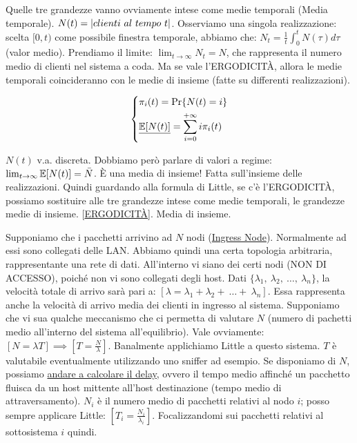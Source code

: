 Quelle tre grandezze vanno ovviamente intese come medie temporali (Media temporale). $N(t) = \left\vert{clienti\ al\ tempo\ t}\right\vert$. Osserviamo una singola realizzazione: scelta $[0,t)$ come possibile finestra temporale, abbiamo che: $N_t = \frac{1}{t}\int_0^t{N(\tau)d\tau}$ (valor medio). Prendiamo il limite: $\lim_{t\to\infty}{N_t} = N$, che rappresenta il numero medio di clienti nel sistema a coda. Ma se vale l'ERGODICIT\`A, allora le medie temporali coincideranno con le medie di insieme (fatte su differenti realizzazioni).

\[
	\left\{
	\begin{aligned}	
	&\pi_i(t) = \Pr\{N(t) = i\}\\
	&\underline{\operatorname{\mathbb{E}}[N(t)]} = \sum_{i=0}^{+\infty}{i\pi_i(t)}
	\end{aligned}
	\right.
\]

$N(t)$ v.a. discreta. Dobbiamo però parlare di valori a regime: $\lim_{t\to\infty}{\operatorname{\mathbb{E}}[N(t)]} = \bar{N}$. \`E una media di insieme! Fatta sull'insieme delle realizzazioni. Quindi guardando alla formula di Little, se c'è l'ERGODICIT\`A, possiamo sostituire alle tre grandezze intese come medie temporali, le grandezze medie di insieme. [\underline{ERGODICIT\`A}]. Media di insieme.

Supponiamo che i pacchetti arrivino ad $N$ nodi (\underline{Ingress Node}). Normalmente ad essi sono collegati delle LAN. Abbiamo quindi una certa topologia arbitraria, rappresentante una rete di dati. All'interno vi siano dei certi nodi (NON DI ACCESSO), poiché non vi sono collegati degli host. Dati $\{\lambda_1,\ \lambda_2,\ \dots,\ \lambda_n\}$, la velocità totale di arrivo sarà pari a: $[\lambda = \lambda_1 + \lambda_2 +\ \dots+\ \lambda_n]$. Essa rappresenta anche la velocità di arrivo media dei clienti in ingresso al sistema. Supponiamo che vi sua qualche meccanismo che ci permetta di valutare $N$ (numero di pachetti medio all'interno del sistema all'equilibrio). Vale ovviamente: $[N=\lambda T] \implies [T = \frac{N}{\lambda}]$. Banalmente applichiamo Little a questo sistema. $T$ è valutabile eventualmente utilizzando uno sniffer ad esempio. Se disponiamo di $N$, possiamo \underline{andare a calcolare il delay}, ovvero il tempo medio affinché un pacchetto fluisca da un host mittente all'host destinazione (tempo medio di attraversamento). $N_i$ è il numero medio di pacchetti relativi al nodo $i$; posso sempre applicare Little: $[T_i = \frac{N_i}{\lambda_i}]$. Focalizzandomi sui pacchetti relativi al sottosistema $i$ quindi.

\newpage

